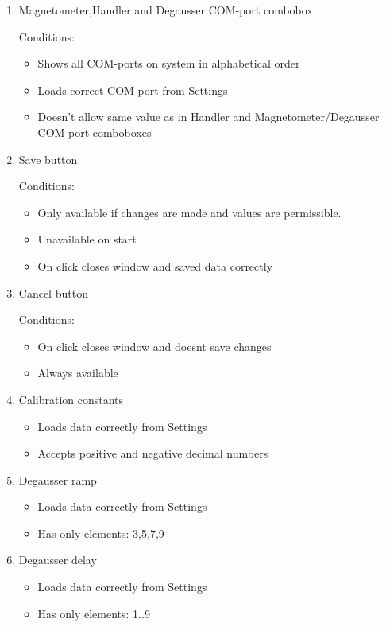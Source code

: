 \begin{enumerate}

\item Magnetometer,Handler and Degausser COM-port combobox

Conditions:
\begin{itemize}
\item Shows all COM-ports on system in alphabetical order
\item Loads correct COM port from Settings
\item Doesn't allow same value as in Handler and Magnetometer/Degausser COM-port comboboxes
\end{itemize}

\item Save button

Conditions:
\begin{itemize}
\item Only available if changes are made and values are permissible.
\item Unavailable on start
\item On click closes window and saved data correctly
\end{itemize}

\item Cancel button

Conditions:
\begin{itemize}
\item On click closes window and doesnt save changes
\item Always available
\end{itemize}

\item Calibration constants
\begin{itemize}
\item Loads data correctly from Settings
\item Accepts positive and negative decimal numbers
\end{itemize}

\item Degausser ramp
\begin{itemize}
\item Loads data correctly from Settings
\item Has only elements: 3,5,7,9
\end{itemize}

\item Degausser delay
\begin{itemize}
\item Loads data correctly from Settings
\item Has only elements: 1..9
\end{itemize}


\end{enumerate}
